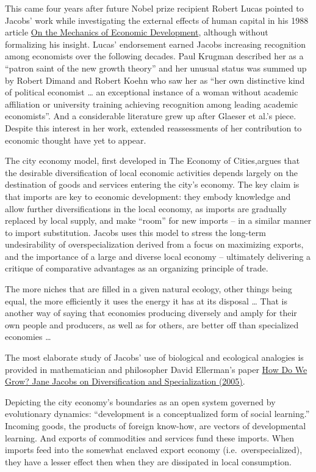\documentclass[
]{book}
\begin{document}
This came four years after future Nobel prize recipient Robert Lucas pointed to Jacobs' work while investigating the external effects of human capital in his 1988 article
\href{https://www.sciencedirect.com/science/article/abs/pii/0304393288901687}{On the Mechanics of Economic Development},
although without formalizing his insight.
Lucas' endorsement earned Jacobs increasing recognition among economists over the following decades.
Paul Krugman described her as a ``patron saint of the new growth theory'' and her unusual status
was summed up by Robert Dimand and Robert Koehn who saw her as
``her own distinctive kind of political economist \ldots{}
an exceptional instance of a woman without academic affiliation or university training
achieving recognition among leading academic economists''.
And a considerable literature grew up after Glaeser et al.'s piece.
Despite this interest in her work, extended reassessments of her contribution
to economic thought have yet to appear.

The city economy model, first developed in The Economy of Cities,argues that the desirable diversification of local economic activities depends largely on the destination of goods and services entering the city's economy. The key claim is that imports are key to economic development: they embody knowledge and allow further diversifications in the local economy, as imports are gradually replaced by local supply, and make ``room'' for new imports -- in a similar manner to import substitution. Jacobs uses this model to stress the long-term undesirability of overspecialization derived from a focus on maximizing exports, and the importance of a large and diverse local economy -- ultimately delivering a critique of comparative advantages as an organizing principle of trade.

The more niches that are filled in a given natural ecology, other things being equal,
the more efficiently it uses the energy it has at its disposal \ldots{}
That is another way of saying that economies producing diversely and amply
for their own people and producers, as well as for others,
are better off than specialized economies \ldots{}

The most elaborate study of Jacobs' use of biological and ecological analogies is provided in mathematician and philosopher David Ellerman's paper \href{http://www.ellerman.org/how-do-we-grow-jane-jacobs-on-diversification-and-specialization/}{How Do We Grow? Jane Jacobs on Diversification and Specialization (2005)}.

Depicting the city economy's boundaries as an open system governed by evolutionary dynamics:
``development is a conceptualized form of social learning.''
Incoming goods, the products of foreign know-how, are vectors of developmental learning.
And exports of commodities and services fund these imports.
When imports feed into the somewhat enclaved export economy (i.e.~overspecialized),
they have a lesser effect then when they are dissipated in local consumption.
\end{document}
